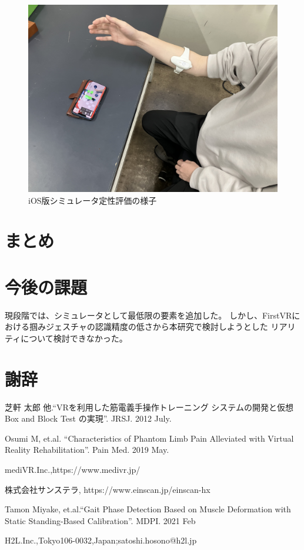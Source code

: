\documentclass{ltjsreport}
\begin{document}
		\begin{figure}[H]
		\centering
		\includegraphics[width = 12cm]{../figs/IMG_6323.jpg}
		\caption{iOS版シミュレータ定性評価の様子}
		\label{}
		\end{figure}

\chapter{まとめ}

\chapter{今後の課題}
	現段階では、シミュレータとして最低限の要素を追加した。
	しかし、FirstVRにおける掴みジェスチャの認識精度の低さから本研究で検討しようとした
	リアリティについて検討できなかった。
\clearpage

\chapter*{謝辞}

\begin{thebibliography}{99}

	芝軒 太郎 他.``VRを利用した筋電義手操作トレーニング
	システムの開発と仮想 Box and Block Test の実現''.
	JRSJ. 2012 July.

	Osumi M, et.al.
	``Characteristics of Phantom Limb Pain Alleviated
	with Virtual Reality Rehabilitation''.
	Pain Med. 2019 May.

	mediVR.Inc.,https://www.medivr.jp/
	

	株式会社サンステラ, https://www.einscan.jp/einscan-hx
	
	Tamon Miyake, et.al.``Gait Phase Detection Based on Muscle Deformation
	with Static Standing-Based Calibration''.
	MDPI. 2021 Feb


	H2L.Inc.,Tokyo106-0032,Japan;satoshi.hosono@h2l.jp



\end{thebibliography}
\end{document}
